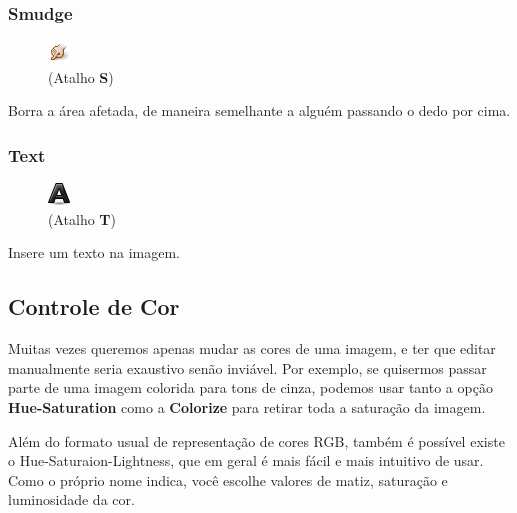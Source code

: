 \documentclass[12pt,onecolumn]{article}
\begin{document}
    \subsubsection{Smudge}
    \begin{figure}
      \vspace{-40pt}
      \begin{center}
        \includegraphics{gimp-icons/stock-tool-smudge-22.png} \\
        (Atalho {\bf S})
      \end{center}
      \label{fig:smudge}
      \vspace{-20pt}
    \end{figure}
    Borra a área afetada, de maneira semelhante a alguém passando o dedo por cima.
    
    \subsubsection{Text}
    \begin{figure}
      \vspace{-50pt}
      \begin{center}
        \includegraphics{gimp-icons/stock-tool-text-22.png} \\
        (Atalho {\bf T})
      \end{center}
      \label{fig:text}
      \vspace{-20pt}
    \end{figure}
    Insere um texto na imagem.
    
    \subsection{Controle de Cor}
    \label{sec:color_control}
  
    Muitas vezes queremos apenas mudar as cores de uma imagem, e ter que editar
    manualmente seria exaustivo senão inviável. Por exemplo, se quisermos passar
    parte de uma imagem colorida para tons de cinza, podemos usar tanto a opção
    {\bf Hue-Saturation} como a {\bf Colorize} para retirar toda a saturação da
    imagem.
    
    \begin{framed}
      Além do formato usual de representação de cores RGB, também é possível
      existe o Hue-Saturaion-Lightness, que em geral é mais fácil e mais
      intuitivo de usar. Como o próprio nome indica, você escolhe valores de
      matiz, saturação e luminosidade da cor.
    \end{framed}
    
\end{document}
